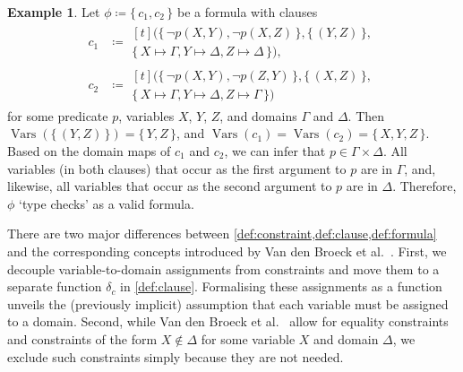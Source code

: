 \documentclass{article}
\theoremstyle{definition}
\newtheorem{example}{Example}
\DeclareMathOperator{\Vars}{Vars}
\begin{document}
\begin{example}\label{example:first}
  Let $\phi \coloneqq \{\, c_1, c_2 \,\}$ be a formula with clauses
  \begin{align*}
    c_1 &\coloneqq
          \begin{multlined}[t]
            (\{\, \neg p(X, Y), \neg p(X, Z) \,\}, \{\, (Y, Z) \,\}, \\
            \{\, X \mapsto \Gamma, Y \mapsto \Delta, Z \mapsto \Delta \,\}),
          \end{multlined}\\
    c_2 &\coloneqq
          \begin{multlined}[t]
            (\{\, \neg p(X, Y), \neg p(Z, Y) \,\}, \{\, (X, Z) \,\}, \\
            \{\, X \mapsto \Gamma, Y \mapsto \Delta, Z \mapsto \Gamma \,\})
          \end{multlined}
  \end{align*}
  for some predicate $p$, variables $X$, $Y$, $Z$, and domains $\Gamma$ and
  $\Delta$. Then $\Vars(\{\, (Y, Z) \,\}) = \{\, Y, Z \,\}$, and
  $\Vars(c_{1}) = \Vars(c_{2}) = \{\, X, Y, Z \,\}$. Based on the domain maps of
  $c_{1}$ and $c_{2}$, we can infer that $p \in \Gamma \times \Delta$. All
  variables (in both clauses) that occur as the first argument to $p$ are in
  $\Gamma$, and, likewise, all variables that occur as the second argument to
  $p$ are in $\Delta$. Therefore, $\phi$ `type checks' as a valid formula.
\end{example}

There are two major differences between
\cref{def:constraint,def:clause,def:formula} and the corresponding concepts
introduced by Van den Broeck et al.~.
First, we decouple variable-to-domain assignments from constraints and move them
to a separate function $\delta_{c}$ in \cref{def:clause}. Formalising these
assignments as a function unveils the (previously implicit) assumption that each
variable must be assigned to a domain. Second, while Van den Broeck et
al.~ allow for equality constraints and
constraints of the form $X \not\in \Delta$ for some variable $X$ and domain
$\Delta$, we exclude such constraints simply because they are not needed.
\end{document}

